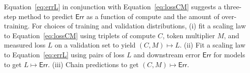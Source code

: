 Equation~\eqref{eq:errL} in conjunction with Equation~\eqref{eq:lossCM} suggests a three-step method to predict $\textsf{Err}$ as a function of compute and the amount of over-training.
For choices of training and validation distributions,
(i) fit a scaling law to Equation~\eqref{eq:lossCM} using triplets of compute $C$, token multiplier $M$, and measured loss $L$ on a validation set to yield $(C, M) \mapsto L$.
(ii) Fit a scaling law to Equation~\eqref{eq:errL}  using pairs of loss $L$ and downstream error $\textsf{Err}$ for models to get $L \mapsto \textsf{Err}$.
(iii) Chain predictions to get $(C, M) \mapsto \textsf{Err}$.
